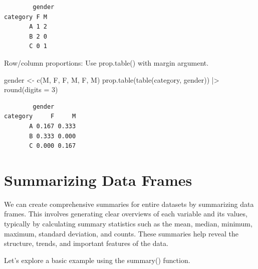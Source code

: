 \documentclass[
  man,
  floatsintext,
  longtable,
  nolmodern,
  notxfonts,
  notimes,
  colorlinks=true,linkcolor=blue,citecolor=blue,urlcolor=blue]{apa7}
\newenvironment{Shaded}{\begin{snugshade}}{\end{snugshade}}
\newcommand{\AttributeTok}[1]{\textcolor[rgb]{0.40,0.45,0.13}{#1}}
\newcommand{\DecValTok}[1]{\textcolor[rgb]{0.68,0.00,0.00}{#1}}
\newcommand{\FunctionTok}[1]{\textcolor[rgb]{0.28,0.35,0.67}{#1}}
\newcommand{\NormalTok}[1]{\textcolor[rgb]{0.00,0.23,0.31}{#1}}
\newcommand{\OtherTok}[1]{\textcolor[rgb]{0.00,0.23,0.31}{#1}}
\newcommand{\SpecialCharTok}[1]{\textcolor[rgb]{0.37,0.37,0.37}{#1}}
\newcommand{\StringTok}[1]{\textcolor[rgb]{0.13,0.47,0.30}{#1}}
\begin{document}
\begin{verbatim}
        gender
category F M
       A 1 2
       B 2 0
       C 0 1
\end{verbatim}

Row/column proportions: Use prop.table() with margin argument.

\begin{Shaded}
\begin{Highlighting}[]
\NormalTok{gender }\OtherTok{\textless{}{-}} \FunctionTok{c}\NormalTok{(}\StringTok{\textquotesingle{}M\textquotesingle{}}\NormalTok{, }\StringTok{\textquotesingle{}F\textquotesingle{}}\NormalTok{, }\StringTok{\textquotesingle{}F\textquotesingle{}}\NormalTok{, }\StringTok{\textquotesingle{}M\textquotesingle{}}\NormalTok{, }\StringTok{\textquotesingle{}F\textquotesingle{}}\NormalTok{, }\StringTok{\textquotesingle{}M\textquotesingle{}}\NormalTok{)}
\FunctionTok{prop.table}\NormalTok{(}\FunctionTok{table}\NormalTok{(category, gender)) }\SpecialCharTok{|\textgreater{}}
\FunctionTok{round}\NormalTok{(}\AttributeTok{digits =} \DecValTok{3}\NormalTok{)}
\end{Highlighting}
\end{Shaded}

\begin{verbatim}
        gender
category     F     M
       A 0.167 0.333
       B 0.333 0.000
       C 0.000 0.167
\end{verbatim}

\newpage

\section{Summarizing Data Frames}\label{summarizing-data-frames}

We can create comprehensive summaries for entire datasets by summarizing
data frames. This involves generating clear overviews of each variable
and its values, typically by calculating summary statistics such as the
mean, median, minimum, maximum, standard deviation, and counts. These
summaries help reveal the structure, trends, and important features of
the data.

Let's explore a basic example using the summary() function.
\end{document}
